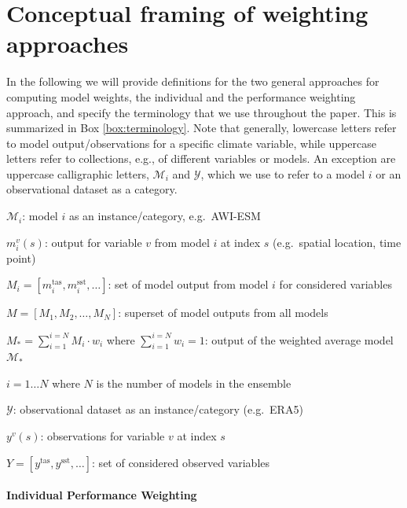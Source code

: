 \section{Conceptual framing of weighting approaches}\label{sec:framing}

In the following we will provide definitions for the two general approaches for computing model weights, the individual and the performance weighting approach, and specify the terminology that we use throughout the paper. 
This is summarized in Box \ref{box:terminology}.
Note that generally, lowercase letters refer to model output/observations for a specific climate variable, while uppercase letters refer to collections, e.g., of different variables or models.
An exception are uppercase calligraphic letters, $\mathcal{M}_i$ and $\mathcal{Y}$, which we use to refer to a model $i$ or an observational dataset as a category.

\begin{definitionbox}[Terminology]\label{box:terminology}
$\mathcal{M}_i$: model $i$ as an instance/category, e.g.~AWI-ESM 

$m^v_{i}(s)$: output for variable $v$ from model $i$ at index $s$ (e.g.~spatial location, time point)

$M_i = [m^{\textrm{tas}}_i, m^{\textrm{sst}}_i, \dots]$: set of model output from model $i$ for considered variables

$M = [M_1, M_2, \dots, M_N]$: superset of model outputs from all models

$M_* = \sum_{i=1}^{i=N} M_i \cdot w_i$ where $\sum_{i=1}^{i=N} w_i = 1$: output of the weighted average model $\mathcal{M}_*$ 

$i=1\dots N$ where $N$ is the number of models in the ensemble

\bigskip
$\mathcal{Y}$: observational dataset as an instance/category (e.g.~ERA5)

$y^v(s)$: observations for variable $v$ at index $s$

$Y = [y^{\textrm{tas}}, y^{\textrm{sst}}, \dots]$: set of considered observed variables

\end{definitionbox}

\paragraph*{Individual Performance Weighting}

